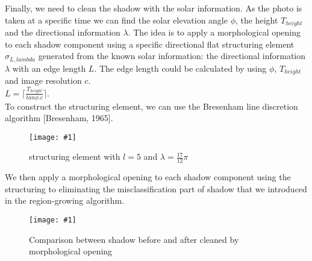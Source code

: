 \documentclass[runningheads]{llncs}
\newcommand{\insertF}[4]{
  \begin{figure}[h!]
    \centering
    \begin{minipage}{#3\linewidth}
    \texttt{[image: \#1]}
    \end{minipage}  
      \caption{#2}
      \label{#4}
  \end{figure}  
}
\begin{document}
Finally, we need to clean the shadow with the solar information. As the photo is taken at a specific time we can find the solar elevation angle $\phi$, the height $T_{height}$ and the directional information $\lambda$. The idea is to apply a morphological opening to each shadow component using a specific directional flat structuring element $\sigma_{L,lambda}$ generated from the known solar information: the directional information $\lambda$ with an edge length $L$. The edge length could be calculated by using $\phi$, $T_{height}$ and image resolution $c$. \\
$L=\lceil \frac{T_{height}}{tan \phi.c}\rceil$.\\
To construct the structuring element, we can use the Bresenham line discretion algorithm [Bresenham, 1965].\\
\insertF{se}{structuring element with $l=5$ and $\lambda=\frac{17}{12}\pi$}{0.3}{2}

We then apply a morphological opening to each shadow component using the structuring to eliminating the misclassification part of shadow that we introduced in the region-growing algorithm.\\
\insertF{difference}{Comparison between shadow before and after cleaned by morphological opening}{0.9}{3}
\end{document}
